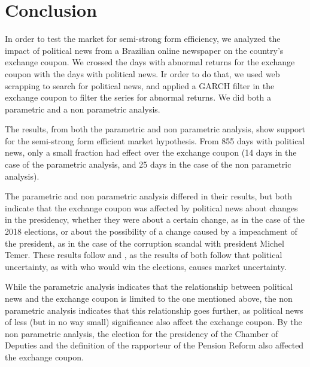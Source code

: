 \documentclass[a4paper]{article}
\begin{document}
\section{Conclusion}

In order to test the market for semi-strong form efficiency, we analyzed the impact of political news from a Brazilian online newspaper on the country's exchange coupon. We crossed the days with abnormal returns for the exchange coupon with the days with political news. Ir order to do that, we used web scrapping to search for political news, and applied a GARCH filter in the exchange coupon to filter the series for abnormal returns. We did both a parametric and a non parametric analysis.

The results, from both the parametric and non parametric analysis, show support for the semi-strong form efficient market hypothesis. From 855 days with political news, only a small fraction had effect over the exchange coupon (14 days in the case of the parametric analysis, and 25 days in the case of the non parametric analysis).

The parametric and non parametric analysis differed in their results, but both indicate that the exchange coupon was affected by political news about changes in the presidency, whether they were about a certain change, as in the case of the 2018 elections, or about the possibility of a change caused by a impeachment of the president, as in the case of the corruption scandal with president Michel Temer. These results follow \cite{smales2015} and \cite{marquessantos2016}, as the results of both follow that political uncertainty, as with who would win the elections, causes market uncertainty.

While the parametric analysis indicates that the relationship between political news and the exchange coupon is limited to the one mentioned above, the non parametric analysis indicates that this relationship goes further, as political news of less (but in no way small) significance also affect the exchange coupon. By the non parametric analysis, the election for the presidency of the Chamber of Deputies and the definition of the rapporteur of the Pension Reform also affected the exchange coupon.





\begin{comment}

The best forecast for the asset price in the next period is always the current price. (quem disse isso? acho que propio Fama)
The best estimate for the asset return in the long term is always the normal return for the risk of the asset (quem fisse isso?)

\end{comment}
\end{document}

